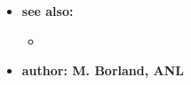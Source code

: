 \begin{itemize}
\item {\bf see also:}
    \begin{itemize}
%
%
    \item {}
    \end{itemize}
%
%
\item {\bf author: M. Borland, ANL} 
\end{itemize}
